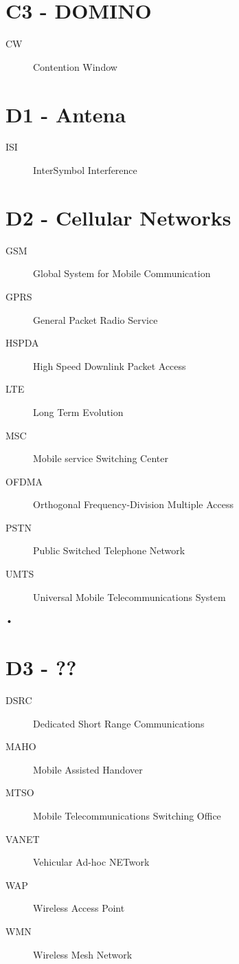 \documentclass[twocolumn]{article}
\begin{document}
\section*{C3 - DOMINO}
\begin{description}
\item[CW]Contention Window
\end{description}

\section*{D1 - Antena}
\begin{description}
\item[ISI]InterSymbol Interference
\end{description}

\section*{D2 - Cellular Networks}
\begin{description}
\item[GSM]Global System for Mobile Communication
\item[GPRS]General Packet Radio Service
\item[HSPDA]High Speed Downlink Packet Access
\item[LTE]Long Term Evolution
\item[MSC]Mobile service Switching Center
\item[OFDMA]Orthogonal Frequency-Division Multiple Access
\item[PSTN]Public Switched Telephone Network
\item[UMTS]Universal Mobile Telecommunications System
\end{description}•

\section{D3 - ??}
\begin{description}
\item[DSRC]Dedicated Short Range Communications
\item[MAHO]Mobile Assisted Handover
\item[MTSO]Mobile Telecommunications Switching Office
\item[VANET]Vehicular Ad-hoc NETwork
\item[WAP]Wireless Access Point
\item[WMN]Wireless Mesh Network
\end{description}
\end{document}
